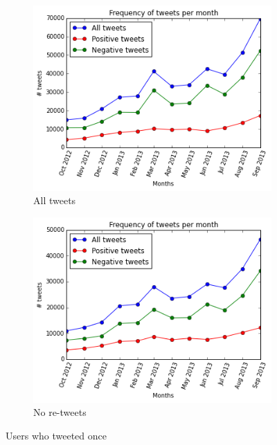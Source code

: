 \documentclass{sig-alternate}
\begin{document}
\begin{figure}
\begin{subfigure}{\columnwidth}
  \centering
  \includegraphics[width=\columnwidth]{download(2).png}
  \caption{All tweets}
  \label{figura:oneTweet}
\end{subfigure}%
\begin{subfigure}{\columnwidth}
  \centering
  \includegraphics[width=\columnwidth]{users_tweeted_once_no_rt.png}
  \caption{No re-tweets}
  \label{figura:no_rtuser}
\end{subfigure}%
\caption{Users who tweeted once}
\end{figure}
\end{document}
